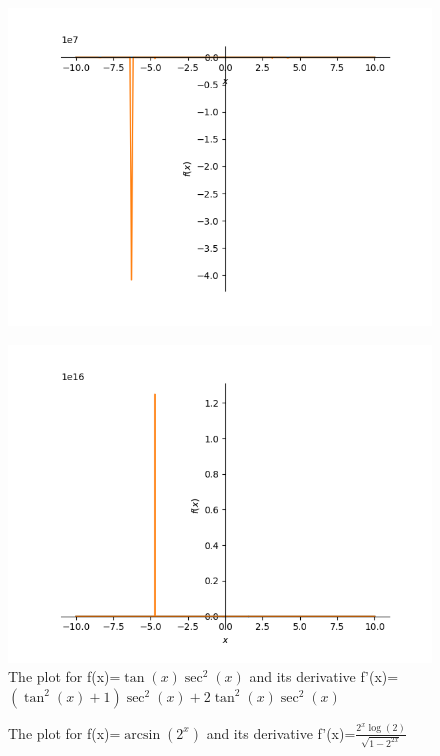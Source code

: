 \documentclass{article}
\begin{document}
\begin{figure}
\includegraphics{plot_32}
\end{figure}\begin{figure}
\caption{The plot for f(x)=$\tan{\left(x \right)} \sec^{2}{\left(x \right)}$ and its derivative f'(x)=$\left(\tan^{2}{\left(x \right)} + 1\right) \sec^{2}{\left(x \right)} + 2 \tan^{2}{\left(x \right)} \sec^{2}{\left(x \right)}$}
\centering
\includegraphics{plot_33}
\end{figure}\begin{figure}
\caption{The plot for f(x)=$\operatorname{\arcsin}{\left(2^{x} \right)}$ and its derivative f'(x)=$\frac{2^{x} \log{\left(2 \right)}}{\sqrt{1 - 2^{2 x}}}$}
\centering

\end{figure}
\end{document}
